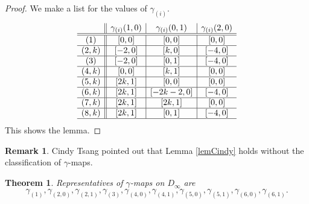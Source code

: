 \documentclass[12pt]{amsart}
\newtheorem{thm}{Theorem}[section]
\theoremstyle{definition}
\newtheorem*{rema}{Remark}
\begin{document}
\begin{proof}
  We make a list for the values of $\gamma_{(i)}$. 
  $$
    \begin{array}{c||c|c|c}
      & \gamma_{(i)}(1,0) & \gamma_{(i)}(0,1) &\gamma_{(i)}(2,0)\\
      \hline
      \hline
      (1) & [0,0] & [0,0] & [0,0] \\
      \hline
      (2,k) & [-2,0] & [k,0] & [-4,0]\\
      \hline
      (3) & [-2,0] & [0,1] & [-4,0]\\
      \hline
      (4,k) & [0,0] & [k,1] & [0,0]\\
      \hline
      (5,k) & [2k,1] & [0,0] & [0,0]\\
      \hline
      (6,k) & [2k,1] & [-2k-2,0] & [-4,0]\\
      \hline
      (7,k) & [2k,1] & [2k,1] & [0,0]\\
      \hline
      (8,k) & [2k,1] & [0,1] & [-4,0]\\
      \hline
    \end{array}
  $$
  This shows the lemma.
\end{proof}

\begin{rema}
  Cindy Tsang pointed out that Lemma \ref{lemCindy}
  holds without the classification of $\gamma$-maps.
\end{rema}

\begin{thm}\label{cls_gamma}
  Representatives of $\gamma$-maps on $D_\infty$ are
  $$\gamma_{(1)}, \gamma_{(2,0)}, \gamma_{(2,1)}, \gamma_{(3)},
  \gamma_{(4,0)}, \gamma_{(4,1)}, \gamma_{(5,0)}, \gamma_{(5,1)},
  \gamma_{(6,0)}, \gamma_{(6,1)}. $$
\end{thm}
\end{document}
